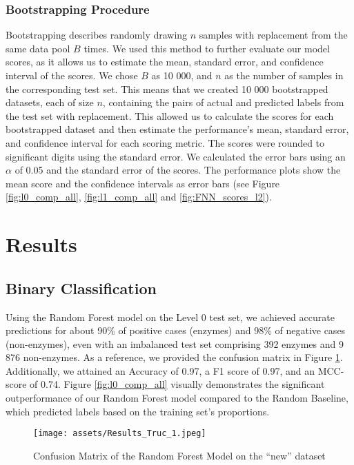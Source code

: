 \documentclass{bioinfo}
\begin{document}
\begin{methods}
\subsubsection{Bootstrapping Procedure}
Bootstrapping describes randomly drawing $n$ samples with replacement from the same data pool $B$ times.
We used this method to further evaluate our model scores, as it allows us to estimate the mean, standard error, and confidence interval of the scores.
We chose $B$ as 10 000, and $n$ as the number of samples in the corresponding test set.
This means that we created 10 000 bootstrapped datasets, each of size $n$, containing the pairs of actual and predicted labels from the test set with replacement.
This allowed us to calculate the scores for each bootstrapped dataset and then estimate the performance's mean, 
standard error, and confidence interval for each scoring metric.
The scores were rounded to significant digits using the standard error.
We calculated the error bars using an $\alpha$ of 0.05 and the standard error of the scores.
The performance plots show the mean score and the confidence intervals as error bars (see Figure \ref{fig:l0_comp_all}, \ref{fig:l1_comp_all} and \ref{fig:FNN_scores_l2}).

\end{methods}

\section{Results}	

\subsection{Binary Classification}\label{sec:RF_level0}
Using the Random Forest model on the Level 0 test set, we achieved accurate
predictions for about 90\% of positive cases (enzymes) and 98\% of negative
cases (non-enzymes), even with an imbalanced test set comprising 392
enzymes and 9 876 non-enzymes. As a reference, we provided the confusion
matrix in Figure \ref{fig:RF_conf_l0}.
Additionally, we attained an Accuracy of 0.97, a F1 score of
0.97, and an MCC-score of 0.74. Figure \ref{fig:l0_comp_all} visually demonstrates the significant outperformance of our Random Forest model 
compared to the Random Baseline, which predicted labels based on the training set's proportions.

\begin{figure}[!hb]
\texttt{[image: assets/Results\_Truc\_1.jpeg]}
\caption{Confusion Matrix of the Random Forest Model on the “new” dataset}\label{fig:RF_conf_l0}
\end{figure}
\end{document}
